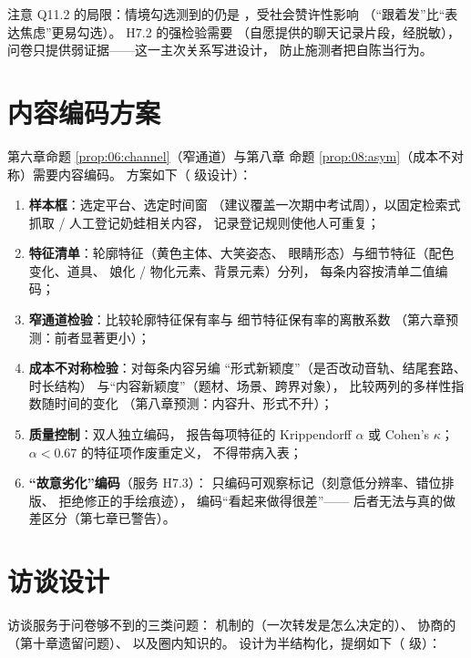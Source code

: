 注意 Q11.2 的局限：情境勾选测到的仍是
，受社会赞许性影响
（“跟着发”比“表达焦虑”更易勾选）。
H7.2 的强检验需要
（自愿提供的聊天记录片段，经脱敏），
问卷只提供弱证据——这一主次关系写进设计，
防止施测者把自陈当行为。

\section{内容编码方案}\label{sec:11:coding}

第六章命题 \ref{prop:06:channel}（窄通道）与第八章
命题 \ref{prop:08:asym}（成本不对称）需要内容编码。
方案如下（ 级设计）：

\begin{enumerate}[label=\arabic*.]
  \item \textbf{样本框}：选定平台、选定时间窗
        （建议覆盖一次期中考试周），以固定检索式
        抓取 / 人工登记奶蛙相关内容，
        记录登记规则使他人可重复；
  \item \textbf{特征清单}：轮廓特征（黄色主体、大笑姿态、
        眼睛形态）与细节特征（配色变化、道具、
        娘化 / 物化元素、背景元素）分列，
        每条内容按清单二值编码；
  \item \textbf{窄通道检验}：比较轮廓特征保有率与
        细节特征保有率的离散系数
        （第六章预测：前者显著更小）；
  \item \textbf{成本不对称检验}：对每条内容另编
        “形式新颖度”（是否改动音轨、结尾套路、时长结构）
        与“内容新颖度”（题材、场景、跨界对象），
        比较两列的多样性指数随时间的变化
        （第八章预测：内容升、形式不升）；
  \item \textbf{质量控制}：双人独立编码，
        报告每项特征的 Krippendorff $\alpha$
        或 Cohen's $\kappa$；
        $\alpha < 0.67$ 的特征项作废重定义，
        不得带病入表；
  \item \textbf{“故意劣化”编码}（服务 H7.3）：
        只编码可观察标记（刻意低分辨率、错位排版、
        拒绝修正的手绘痕迹），
        编码“看起来做得很差”——
        后者无法与真的做差区分（第七章已警告）。
\end{enumerate}

\section{访谈设计}\label{sec:11:interview}

访谈服务于问卷够不到的三类问题：
机制的（一次转发是怎么决定的）、
协商的（第十章遗留问题）、
以及圈内知识的。
设计为半结构化，提纲如下（ 级）：

